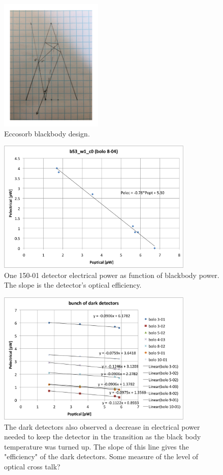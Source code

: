 \begin{figure}[ht!]
\begin{center}
\includegraphics[height=2.5in]{figures/blackbody_design2}
\caption{Eccosorb blackbody design. 
\label{fig:blackbody_design} }
\end{center}
\end{figure}

\begin{figure}[ht!]
\begin{center}
\includegraphics[height=2.5in]{figures/Nb01_PelecvsPopt_b53_w1_c0}
\caption{One 150-01 detector electrical power as function of blackbody power. The slope is the detector's optical efficiency. 
\label{fig:pelec_vs_popt} }
\end{center}
\end{figure}


\begin{figure}[ht!]
\begin{center}
\includegraphics[height=2.5in]{figures/darkdetectoreffs}
\caption{The dark detectors also observed a decrease in electrical power needed to keep the detector in the transition as the black body temperature was turned up. The slope of this line gives the "efficiency" of the dark detectors. Some measure of the level of optical cross talk?
\label{fig:dark_optical_efficiencies} }
\end{center}
\end{figure}


